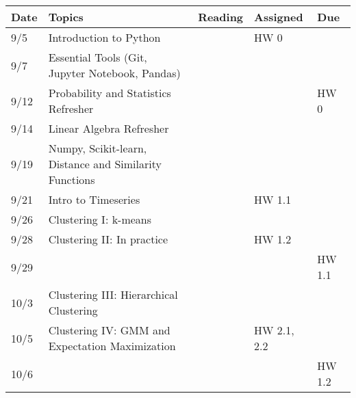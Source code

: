 \documentclass[11pt]{article}
\begin{document}
\small
\begin{centering}
\begin{tabular}{||l|p{3in}|l|l|l||}
\hline\hline
Date & Topics  & Reading & Assigned & Due  \\
\hline\hline
9/5 & Introduction to Python &  &  HW 0 & \\
9/7 & Essential Tools (Git, Jupyter Notebook, Pandas) & & & \\

\hline
9/12 & Probability and Statistics Refresher & &  & HW 0 \\
9/14 & Linear Algebra Refresher & & & \\
\hline
 9/19 & Numpy, Scikit-learn, Distance and Similarity Functions & &  & \\
9/21 & Intro to Timeseries & & HW 1.1& \\ 
\hline

9/26 & Clustering I: k-means & & & \\
9/28 & Clustering II: In practice & &HW 1.2  & \\ 
9/29 &&&& HW 1.1 \\
\hline

10/3 & Clustering III: Hierarchical Clustering & & & \\  
10/5 & Clustering IV: GMM and Expectation Maximization& & HW 2.1, 2.2 & \\ 
10/6 &&&& HW 1.2 \\
\hline


\end{tabular}
\end{centering}
\end{document}
